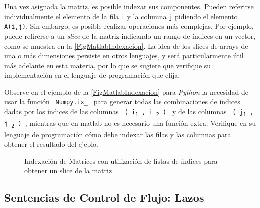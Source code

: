 Una vez asignada la matriz, es posible indexar sus componentes. 
Pueden referirse individualmente el elemento de la fila \texttt{i} y la
columna \texttt{j} pidiendo el elemento \texttt{A(i,j)}. Sin 
embargo, es posible realizar operaciones más complejas. Por ejemplo,
puede refirerse a un \emph{slice} de la matriz indicando un rango 
de índices en un vector, como se muestra en la
\autoref{FigMatlabIndexacion}. La idea de los slices de arrays de una o 
más dimensiones persiste en otros lenguajes, y será particularmente
útil más adelante en esta materia, por lo que se sugiere que
verifique su implementación en el lenguaje de programación 
que elija. 

Observe en el ejemplo de la \autoref{FigMatlabIndexacion} para \emph{Python}
la necesidad de usar la función \texttt{ Numpy.ix\_ } para generar todas las 
combinaciones de índices dadas por los índices de las columnas 
\texttt{ ( i\textsubscript{1} , i \textsubscript{2} ) }
y de las columnas \texttt{ ( j\textsubscript{1} , j \textsubscript{2} ) }, 
mientras que en matlab no es necesario
una función extra. Verifique en su lenguaje de programación cómo debe indexar 
las filas y las columnas para obtener el resultado del ejeplo. 

\mode*

\begin{figure}
  \caption{ Indexación de Matrices con utilización de lístas de índices para
 obtener un slice de la matriz \label{FigMatlabIndexacion} }
\end{figure}

\mode*

\subsection{Sentencias de Control de Flujo: Lazos}


